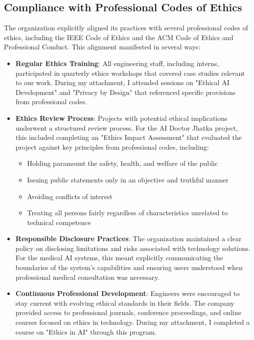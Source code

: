 \documentclass[12pt,a4paper]{article}
\begin{document}
\subsection{Compliance with Professional Codes of Ethics}

The organization explicitly aligned its practices with several professional codes of ethics, including the IEEE Code of Ethics and the ACM Code of Ethics and Professional Conduct. This alignment manifested in several ways:

\begin{itemize}
    \item \textbf{Regular Ethics Training}: All engineering staff, including interns, participated in quarterly ethics workshops that covered case studies relevant to our work. During my attachment, I attended sessions on "Ethical AI Development" and "Privacy by Design" that referenced specific provisions from professional codes.
    
    \item \textbf{Ethics Review Process}: Projects with potential ethical implications underwent a structured review process. For the AI Doctor Jhatka project, this included completing an "Ethics Impact Assessment" that evaluated the project against key principles from professional codes, including:
    \begin{itemize}
        \item Holding paramount the safety, health, and welfare of the public
        \item Issuing public statements only in an objective and truthful manner
        \item Avoiding conflicts of interest
        \item Treating all persons fairly regardless of characteristics unrelated to technical competence
    \end{itemize}
    
    \item \textbf{Responsible Disclosure Practices}: The organization maintained a clear policy on disclosing limitations and risks associated with technology solutions. For the medical AI systems, this meant explicitly communicating the boundaries of the system's capabilities and ensuring users understood when professional medical consultation was necessary.
    
    \item \textbf{Continuous Professional Development}: Engineers were encouraged to stay current with evolving ethical standards in their fields. The company provided access to professional journals, conference proceedings, and online courses focused on ethics in technology. During my attachment, I completed a course on "Ethics in AI" through this program.
\end{itemize}
\end{document}
